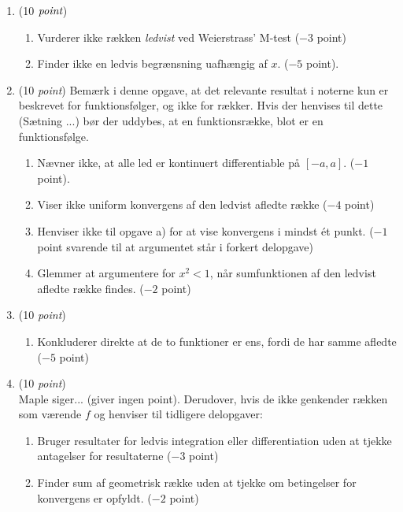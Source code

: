 \documentclass{article}
\begin{document}
\begin{opg}\hfill
	\begin{enumerate}
		\item (10 $ \emph{point} $)
		\begin{enumerate}[label=(\roman*)]
			\item Vurderer ikke rækken \emph{ledvist} ved Weierstrass' M-test ($ -3 $ point)
			\item Finder ikke en ledvis begrænsning uafhængig af $ x $. ($ -5 $ point).
		\end{enumerate}
		\item (10 \emph{point}) Bemærk i denne opgave, at det relevante resultat i noterne kun er beskrevet for funktionsfølger, og ikke for rækker. Hvis der henvises til dette (Sætning ...) bør der uddybes, at en funktionsrække, blot er en funktionsfølge.
		\begin{enumerate}[label=(\roman*)] 
			\item Nævner ikke, at alle led er kontinuert differentiable på $ [-a,a] $. ($ -1 $ point).
			\item Viser ikke uniform konvergens af den ledvist afledte række ($ -4 $ point)
			\item Henviser ikke til opgave a) for at vise konvergens i mindst ét punkt. ($ -1 $ point svarende til at argumentet står i forkert delopgave)
			\item Glemmer at argumentere for $ x^2<1 $, når sumfunktionen af den ledvist afledte række findes. ($ -2 $ point) 
		\end{enumerate}
		\item (10 \emph{point})
		\begin{enumerate}[label=(\roman*)]
			\item Konkluderer direkte at de to funktioner er ens, fordi de har samme afledte ($ -5 $ point)
		\end{enumerate}
		\item (10 \emph{point})\hfill\\
		Maple siger... (giver ingen point). Derudover, hvis de ikke genkender rækken som værende $ f $ og henviser til tidligere delopgaver:
		\begin{enumerate}[label=(\roman*)]
			\item Bruger resultater for ledvis integration eller differentiation uden at tjekke antagelser for resultaterne ($ -3 $ point)
			\item Finder sum af geometrisk række uden at tjekke om betingelser for konvergens er opfyldt. ($ -2 $ point)
		\end{enumerate}
		
	\end{enumerate}
\end{opg}
\end{document}
